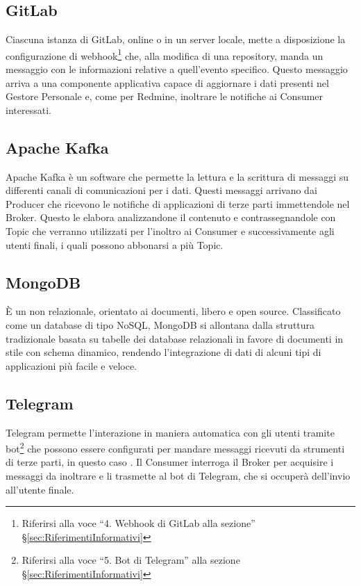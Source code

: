 		\subsection{GitLab}
		Ciascuna istanza di GitLab, online o in un server locale,
        mette a disposizione la configurazione di webhook\footnote{Riferirsi alla voce ``4. Webhook di GitLab alla sezione'' \S\ref{sec:RiferimentiInformativi}}
        che, alla modifica di una repository, manda un messaggio con le informazioni relative a quell'evento specifico.
        Questo messaggio arriva a una componente applicativa capace di
        aggiornare i dati presenti nel Gestore Personale e, come per Redmine, inoltrare le notifiche ai Consumer interessati.
		
		\subsection{Apache Kafka}
		Apache Kafka è un software  che permette la lettura e la scrittura di messaggi su differenti canali di comunicazioni per i dati.
		Questi messaggi arrivano dai Producer che ricevono le notifiche di applicazioni di terze parti immettendole nel Broker. Questo le elabora analizzandone
        il contenuto e contrassegnandole con Topic che verranno utilizzati per l'inoltro ai Consumer e successivamente agli utenti finali, i quali possono abbonarsi a più Topic.
		
        \subsection{MongoDB}\label{MongoDB}
        È un  non relazionale, orientato ai documenti, libero e open source. Classificato come un database di tipo NoSQL, MongoDB si allontana dalla struttura tradizionale basata su tabelle dei database relazionali in favore di documenti in stile  con schema dinamico, rendendo l'integrazione di dati di alcuni tipi di applicazioni più facile e veloce.
        
		\subsection{Telegram}
		Telegram permette l'interazione in maniera automatica con gli utenti tramite
        bot\footnote{Riferirsi alla voce ``5. Bot di Telegram'' alla sezione \S\ref{sec:RiferimentiInformativi}}
        che possono essere configurati per mandare messaggi ricevuti da strumenti di terze parti, in questo caso \progetto.
        Il Consumer interroga il Broker per acquisire i messaggi da inoltrare e li trasmette al bot di Telegram, che si
        occuperà dell'invio all'utente finale.

